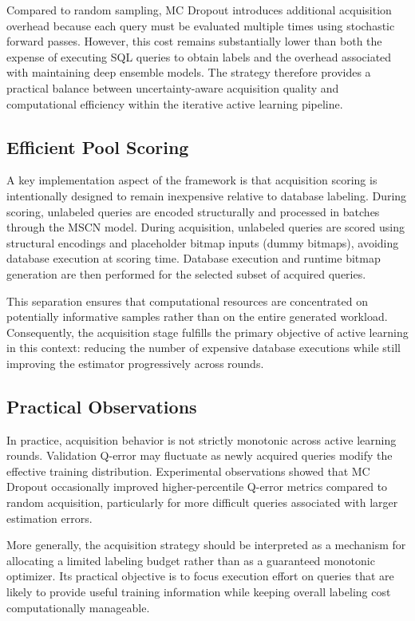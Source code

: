 Compared to random sampling, MC Dropout introduces additional acquisition overhead because each query must be evaluated multiple times using stochastic forward passes. However, this cost remains substantially lower than both the expense of executing SQL queries to obtain labels and the overhead associated with maintaining deep ensemble models. The strategy therefore provides a practical balance between uncertainty-aware acquisition quality and computational efficiency within the iterative active learning pipeline.

\subsection{Efficient Pool Scoring}

A key implementation aspect of the framework is that acquisition scoring is intentionally designed to remain inexpensive relative to database labeling. During scoring, unlabeled queries are encoded structurally and processed in batches through the MSCN model. During acquisition, unlabeled queries are scored using structural encodings and placeholder bitmap inputs (dummy bitmaps), avoiding database execution at scoring time. Database execution and runtime bitmap generation are then performed for the selected subset of acquired queries.

This separation ensures that computational resources are concentrated on potentially informative samples rather than on the entire generated workload\cite{activelearningdriven}. Consequently, the acquisition stage fulfills the primary objective of active learning in this context: reducing the number of expensive database executions while still improving the estimator progressively across rounds.

\subsection{Practical Observations}

In practice, acquisition behavior is not strictly monotonic across active learning rounds. Validation Q-error may fluctuate as newly acquired queries modify the effective training distribution. Experimental observations showed that MC Dropout occasionally improved higher-percentile Q-error metrics compared to random acquisition, particularly for more difficult queries associated with larger estimation errors.

More generally, the acquisition strategy should be interpreted as a mechanism for allocating a limited labeling budget rather than as a guaranteed monotonic optimizer. Its practical objective is to focus execution effort on queries that are likely to provide useful training information while keeping overall labeling cost computationally manageable.

